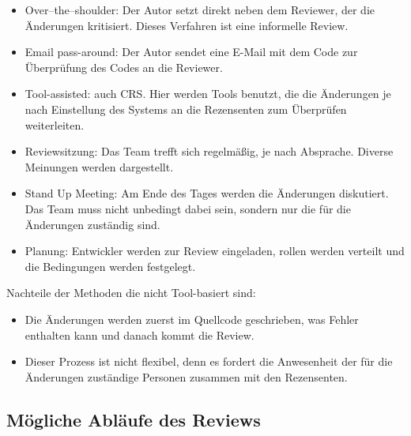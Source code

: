 \begin{itemize}
	\item Over–the–shoulder: Der Autor setzt direkt neben dem Reviewer, der die Änderungen kritisiert. Dieses Verfahren ist eine informelle Review.
	\item Email pass-around: Der Autor sendet eine E-Mail mit dem Code zur Überprüfung des Codes an die Reviewer.
	\item Tool-assisted: auch \ac{CRS}. Hier werden Tools benutzt, die die Änderungen je nach Einstellung des Systems an die Rezensenten zum Überprüfen weiterleiten.
	\item Reviewsitzung: Das Team trefft sich regelmäßig, je nach Absprache. Diverse Meinungen werden dargestellt.
	\item Stand Up Meeting: Am Ende des Tages werden die Änderungen diskutiert. Das Team muss nicht unbedingt dabei sein, sondern nur die für die Änderungen zuständig sind.
	\item Planung: Entwickler werden zur Review eingeladen, rollen werden verteilt und die Bedingungen werden festgelegt.
\end{itemize}

Nachteile der Methoden die nicht Tool-basiert sind:
\begin{itemize}
	\item Die Änderungen werden zuerst im Quellcode geschrieben, was Fehler enthalten kann und danach kommt die Review.
	\item Dieser Prozess ist nicht flexibel, denn es fordert die Anwesenheit der für die Änderungen zuständige Personen zusammen mit den Rezensenten.
\end{itemize}

\subsection{Mögliche Abläufe des Reviews}
\label{sec:review abläufe}

